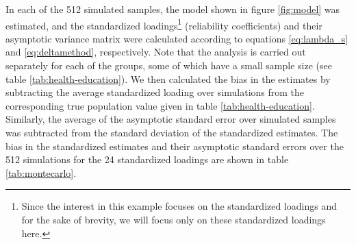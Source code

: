 \documentclass[a4paper,11pt]{article}
\newcommand{\0}{\boldsymbol{0}}
\begin{document}
In each of the 512 simulated samples, the model shown in figure \ref{fig:model} was estimated, and the
standardized loadings\footnote{Since the interest in this
example focuses on the standardized loadings and for the sake of brevity, we will focus only on
these standardized loadings here.} 
 (reliability coefficients) and their asymptotic variance matrix were 
 calculated according to equations \ref{eq:lambda_s} and \ref{eq:deltamethod}, respectively.
Note that the analysis is carried out separately for each of the groups, some of which have a small
sample size (see table \ref{tab:health-education}).
 We then calculated the bias in the estimates by subtracting the average standardized loading over simulations
 from the corresponding true population value given in table \ref{tab:health-education}. 
 Similarly,  the average of the asymptotic standard error over simulated samples was  subtracted from the 
 standard deviation of the standardized estimates.
 The bias in the standardized estimates and their asymptotic standard errors over the 512 simulations
 for the 24 standardized loadings are shown in table \ref{tab:montecarlo}.
\end{document}
